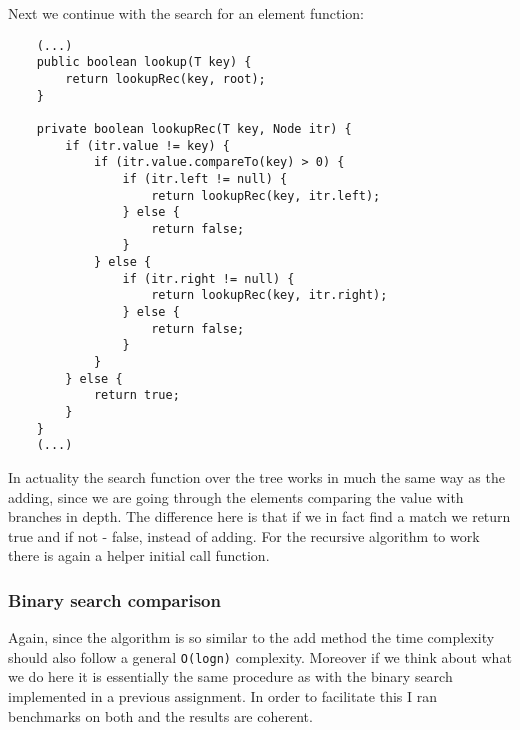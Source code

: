 \documentclass[a4paper,11pt]{article}
\begin{document}
Next we continue with the search for an element function:

\begin{verbatim}
    (...)
    public boolean lookup(T key) {
        return lookupRec(key, root);
    }

    private boolean lookupRec(T key, Node itr) {
        if (itr.value != key) {
            if (itr.value.compareTo(key) > 0) {
                if (itr.left != null) {
                    return lookupRec(key, itr.left);
                } else {
                    return false;
                }
            } else {
                if (itr.right != null) {
                    return lookupRec(key, itr.right);
                } else {
                    return false;
                }
            }
        } else {
            return true;
        }
    }
    (...)
\end{verbatim}

In actuality the search function over the tree works in much the same way as the adding, since we are going through the elements comparing the value with branches in depth. The difference here is that if we in fact find a match we return true and if not - false, instead of adding. For the recursive algorithm to work there is again a helper initial call function. 

\subsubsection*{Binary search comparison}

Again, since the algorithm is so similar to the add method the time complexity should also follow a general {\tt O(logn)} complexity. Moreover if we think about what we do here it is essentially the same procedure as with the binary search implemented in a previous assignment. In order to facilitate this I ran benchmarks on both and the results are coherent.
\end{document}
